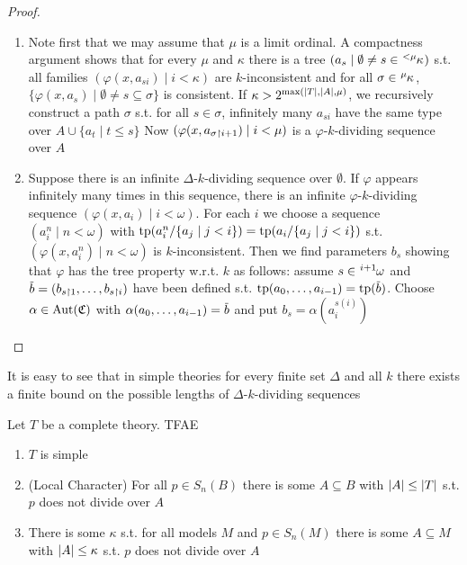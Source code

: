 \documentclass[11pt]{article}
\begin{document}
\begin{proof}
\begin{enumerate}
\item Note first that we may assume that \(\mu\) is a limit ordinal. A compactness argument shows that
for every \(\mu\) and \(\kappa\) there is a tree \((a_s\mid\emptyset\neq s\in\tensor[^{<\mu}]{\kappa}{})\) s.t. all
families \((\varphi(x,a_{si})\mid i<\kappa)\) are \(k\)-inconsistent and for
all \(\sigma\in\tensor[^\mu]{\kappa}{}\), \(\{{\varphi(x,a_s)\mid\emptyset\neq s\subseteq\sigma}\}\) is consistent.
If \(\kappa>2^{\max(\abs{T},\abs{A},\mu)}\), we recursively construct a path \(\sigma\) s.t. for all \(s\in\sigma\),
infinitely many \(a_{si}\) have the same type over \(A\cup\{a_t\mid t\le s\}\)
Now \((\varphi(x,a_{\sigma\upharpoonright i+1})\mid i<\mu)\) is a \(\varphi\)-\(k\)-dividing sequence over \(A\)
\item Suppose there is an infinite \(\Delta\)-\(k\)-dividing sequence over \(\emptyset\). If \(\varphi\) appears infinitely
many times in this sequence, there is an infinite \(\varphi\)-\(k\)-dividing
sequence \((\varphi(x,a_i)\mid i<\omega)\). For each \(i\) we choose a sequence \((a_i^n\mid n<\omega)\)
with \(\operatorname{tp}(a^n_i/\{a_j\mid j<i\})=\operatorname{tp}(a_i/\{a_j\mid j<i\})\) s.t. \((\varphi(x,a_i^n)\mid n<\omega)\)
is \(k\)-inconsistent. Then we find parameters \(b_s\) showing that \(\varphi\) has the tree property
w.r.t. \(k\) as follows: assume \(s\in\tensor[^{i+1}]{\omega}{}\)
and \(\barb=(b_{s\uhr1},\dots,b_{s\uhr i})\) have been defined
s.t. \(\tp(a_0,\dots,a_{i-1})=\tp(\barb)\). Choose \(\alpha\in\operatorname{\text{Aut}}(\mathfrak{C})\) with \(\alpha(a_0,\dots,a_{i-1})=\barb\)
and put \(b_s=\alpha(a_i^{s(i)})\)
\end{enumerate}
\end{proof}

It is easy to see that in simple theories for every finite set \(\Delta\) and all \(k\) there exists a
finite bound on the possible lengths of \(\Delta\)-\(k\)-dividing sequences

\begin{proposition}[]
\label{prop7.2.5}
Let \(T\) be a complete theory. TFAE
\begin{enumerate}
\item \(T\) is simple
\item (Local Character) For all \(p\in S_n(B)\) there is some \(A\subseteq B\) with \(\abs{A}\le\abs{T}\)
s.t. \(p\) does not divide over \(A\)
\item There is some \(\kappa\) s.t. for all models \(M\) and \(p\in S_n(M)\) there is some \(A\subseteq M\)
with \(\abs{A}\le\kappa\) s.t. \(p\) does not divide over \(A\)
\end{enumerate}
\end{proposition}
\end{document}
